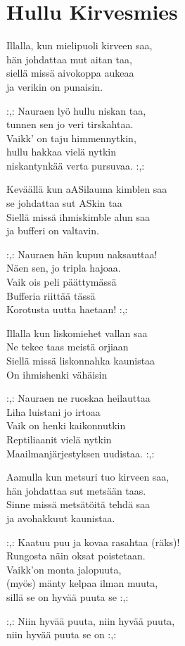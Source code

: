 \section{Hullu Kirvesmies}
Illalla, kun mielipuoli kirveen saa,\\
hän johdattaa mut aitan taa,\\
siellä missä aivokoppa aukeaa\\
ja verikin on punaisin.

:,: Nauraen lyö hullu niskan taa,\\
tunnen sen jo veri tirskahtaa.\\
Vaikk’ on taju himmennytkin,\\
hullu hakkaa vielä nytkin\\
niskantynkää verta pursuvaa. :,:

Keväällä kun aASilauma kimblen saa\\
se johdattaa sut ASkin taa\\
Siellä missä ihmiskimble alun saa\\
ja bufferi on valtavin.

:,: Nauraen hän kupuu naksauttaa!\\
Näen sen, jo tripla hajoaa.\\
Vaik ois peli päättymässä\\
Bufferia riittää tässä\\
Korotusta uutta haetaan! :,:

Illalla kun liskomiehet vallan saa\\
Ne tekee taas meistä orjiaan\\
Siellä missä liskonnahka kaunistaa\\
On ihmishenki vähäisin

:,: Nauraen ne ruoskaa heilauttaa\\
Liha luistani jo irtoaa\\
Vaik on henki kaikonnutkin\\
Reptiliaanit vielä nytkin\\
Maailmanjärjestyksen uudistaa. :,:

Aamulla kun metsuri tuo kirveen saa,\\
hän johdattaa sut metsään taas.\\
Sinne missä metsätöitä tehdä saa\\
ja avohakkuut kaunistaa.

:,: Kaatuu puu ja kovaa rasahtaa (räks)!\\
Rungosta näin oksat poistetaan.\\
Vaikk'on monta jalopuuta,\\
(myös) mänty kelpaa ilman muuta,\\
sillä se on hyvää puuta se :,:

:,: Niin hyvää puuta, niin hyvää puuta,\\
niin hyvää puuta se on :,: